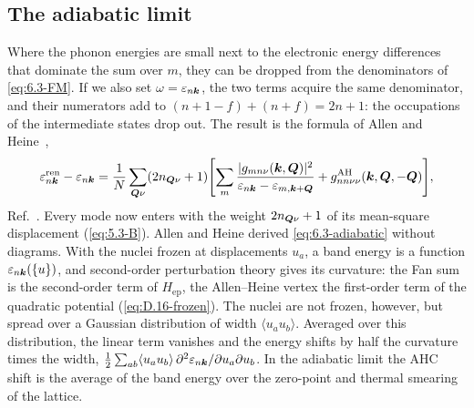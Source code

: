 \subsection{The adiabatic limit}

Where the phonon energies are small next to the electronic energy differences that dominate the sum over $m$, they can be dropped from the denominators of \cref{eq:6.3-FM}. If we also set $\omega = \varepsilon_{n\bm{k}}$, the two terms acquire the same denominator, and their numerators add to $(n + 1 - f) + (n + f) = 2n + 1$: the occupations of the intermediate states drop out. The result is the formula of Allen and Heine~\cite{allen1976theory},
\begin{equation}
  \varepsilon^{\mathrm{ren}}_{n\bm{k}} - \varepsilon_{n\bm{k}} = \frac1N\sum_{\bm{Q}\nu}(2n_{\bm{Q}\nu} + 1)\Biggl[\sum_m\frac{|g_{mn\nu}(\bm{k},\bm{Q})|^2}{\varepsilon_{n\bm{k}} - \varepsilon_{m,\bm{k}+\bm{Q}}} + g^{\mathrm{AH}}_{nn\nu\nu}(\bm{k},\bm{Q},-\bm{Q})\Biggr] ,
  \label{eq:6.3-adiabatic}
\end{equation}
Ref.~\cite[Eq.~(167)]{giustino2017electron}. Every mode now enters with the weight $2n_{\bm{Q}\nu} + 1$ of its mean-square displacement (\cref{eq:5.3-B}). Allen and Heine derived \cref{eq:6.3-adiabatic} without diagrams. With the nuclei frozen at displacements $u_a$, a band energy is a function $\varepsilon_{n\bm{k}}(\{u\})$, and second-order perturbation theory gives its curvature: the Fan sum is the second-order term of $H_{\mathrm{ep}}$, the Allen--Heine vertex the first-order term of the quadratic potential (\cref{eq:D.16-frozen}). The nuclei are not frozen, however, but spread over a Gaussian distribution of width $\langle u_au_b\rangle$. Averaged over this distribution, the linear term vanishes and the energy shifts by half the curvature times the width, $\tfrac12\sum_{ab}\langle u_au_b\rangle\,\partial^2\varepsilon_{n\bm{k}}/\partial u_a\partial u_b$. In the adiabatic limit the AHC shift is the average of the band energy over the zero-point and thermal smearing of the lattice.

